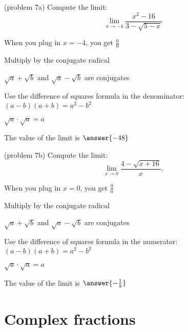 \documentclass[handout]{ximera}
\begin{document}
		
\begin{problem}(problem 7a)
  Compute the limit:
  \[
  \lim_{x \to -4} \frac{x^2 - 16}{3 - \sqrt{5 -x}}
  \]
  
    \begin{hint}
      When you plug in $x = -4$, you get $\frac00$
    \end{hint}
    \begin{hint}
      Multiply by the conjugate radical
    \end{hint}
    \begin{hint}
      $\sqrt a + \sqrt b$ and $\sqrt a - \sqrt b$ are conjugates
    \end{hint}
    \begin{hint}
      Use the difference of squares formula in the denominator: $(a-b)(a+b) = a^2 - b^2$
    \end{hint}
    \begin{hint}
      $\sqrt a \cdot \sqrt a = a$
    \end{hint}
		The value of the limit is
		 $\answer{-48}$
		
\end{problem}



\begin{problem}(problem 7b)
  Compute the limit:
  \[
  \lim_{x \to 0} \frac{4- \sqrt{x + 16}}{x}.
  \]
  
    \begin{hint}
      When you plug in $x = 0$, you get $\frac00$
    \end{hint}
    \begin{hint}
      Multiply by the conjugate radical
    \end{hint}
    \begin{hint}
      $\sqrt a + \sqrt b$ and $\sqrt a - \sqrt b$ are conjugates
    \end{hint}
    \begin{hint}
      Use the difference of squares formula in the numerator: $(a-b)(a+b) = a^2 - b^2$
    \end{hint}
    \begin{hint}
      $\sqrt a \cdot \sqrt a = a$ 
    \end{hint}
		The value of the limit is
		 $\answer{-\frac18}$
		
\end{problem}

\section{Complex fractions}
\end{document}
